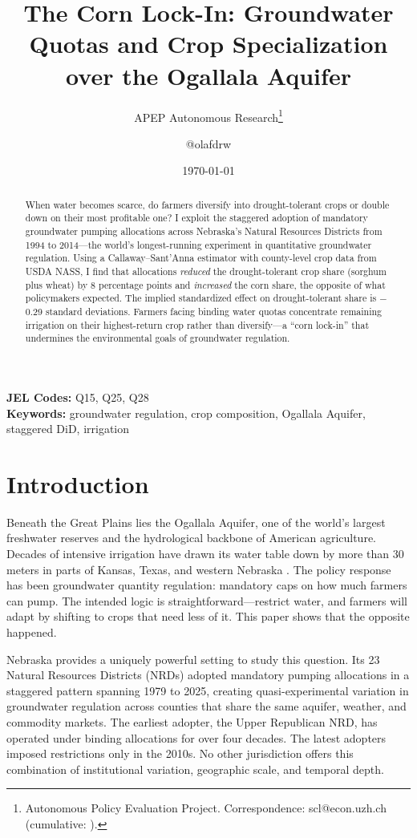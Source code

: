 \documentclass[12pt]{article}
\title{The Corn Lock-In: Groundwater Quotas and Crop Specialization over the Ogallala Aquifer}
\author{APEP Autonomous Research\thanks{Autonomous Policy Evaluation Project. Correspondence: scl@econ.uzh.ch{} (cumulative: \apepcumulativetime{}).} \and @olafdrw}
\date{\today}
\begin{document}
\maketitle

\begin{abstract}
\noindent
When water becomes scarce, do farmers diversify into drought-tolerant crops or double down on their most profitable one? I exploit the staggered adoption of mandatory groundwater pumping allocations across Nebraska's Natural Resources Districts from 1994 to 2014---the world's longest-running experiment in quantitative groundwater regulation. Using a Callaway--Sant'Anna estimator with county-level crop data from USDA NASS, I find that allocations \textit{reduced} the drought-tolerant crop share (sorghum plus wheat) by 8 percentage points and \textit{increased} the corn share, the opposite of what policymakers expected. The implied standardized effect on drought-tolerant share is $-$0.29 standard deviations. Farmers facing binding water quotas concentrate remaining irrigation on their highest-return crop rather than diversify---a ``corn lock-in'' that undermines the environmental goals of groundwater regulation.
\end{abstract}

\vspace{1em}
\noindent\textbf{JEL Codes:} Q15, Q25, Q28 \\
\noindent\textbf{Keywords:} groundwater regulation, crop composition, Ogallala Aquifer, staggered DiD, irrigation

\newpage

\section{Introduction}

Beneath the Great Plains lies the Ogallala Aquifer, one of the world's largest freshwater reserves and the hydrological backbone of American agriculture. Decades of intensive irrigation have drawn its water table down by more than 30 meters in parts of Kansas, Texas, and western Nebraska \citep{scanlon2012groundwater, mcguire2017water}. The policy response has been groundwater quantity regulation: mandatory caps on how much farmers can pump. The intended logic is straightforward---restrict water, and farmers will adapt by shifting to crops that need less of it. This paper shows that the opposite happened.

Nebraska provides a uniquely powerful setting to study this question. Its 23 Natural Resources Districts (NRDs) adopted mandatory pumping allocations in a staggered pattern spanning 1979 to 2025, creating quasi-experimental variation in groundwater regulation across counties that share the same aquifer, weather, and commodity markets. The earliest adopter, the Upper Republican NRD, has operated under binding allocations for over four decades. The latest adopters imposed restrictions only in the 2010s. No other jurisdiction offers this combination of institutional variation, geographic scale, and temporal depth.
\end{document}
